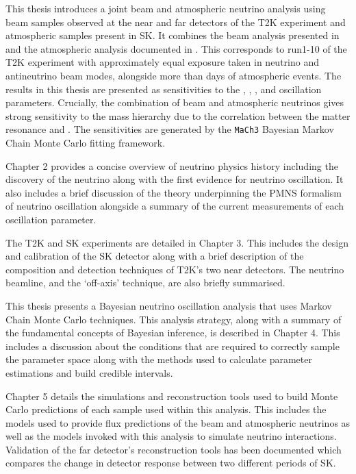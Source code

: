 This thesis introduces a joint beam and atmospheric neutrino analysis using beam samples observed at the near and far detectors of the T2K experiment and atmospheric samples present in SK. It combines the beam analysis presented in \cite{Dunne2020-uf} and the atmospheric analysis documented in \cite{Jiang2019-iw}. This corresponds to run1-10 of the T2K experiment with approximately equal exposure taken in neutrino and antineutrino beam modes, alongside more than  days of atmospheric events. The results in this thesis are presented as sensitivities to the , , , and  oscillation parameters. Crucially, the combination of beam and atmospheric neutrinos gives strong sensitivity to the mass hierarchy due to the correlation between the matter resonance and . The sensitivities are generated by the \texttt{MaCh3} Bayesian Markov Chain Monte Carlo fitting framework.

Chapter 2 provides a concise overview of neutrino physics history including the discovery of the neutrino along with the first evidence for neutrino oscillation. It also includes a brief discussion of the theory underpinning the PMNS formalism of neutrino oscillation alongside a summary of the current measurements of each oscillation parameter.

The T2K and SK experiments are detailed in Chapter 3. This includes the design and calibration of the SK detector along with a brief description of the composition and detection techniques of T2K's two near detectors. The neutrino beamline, and the `off-axis' technique, are also briefly summarised. 

This thesis presents a Bayesian neutrino oscillation analysis that uses Markov Chain Monte Carlo techniques. This analysis strategy, along with a summary of the fundamental concepts of Bayesian inference, is described in Chapter 4. This includes a discussion about the conditions that are required to correctly sample the parameter space along with the methods used to calculate parameter estimations and build credible intervals.

Chapter 5 details the simulations and reconstruction tools used to build Monte Carlo predictions of each sample used within this analysis. This includes the models used to provide flux predictions of the beam and atmospheric neutrinos as well as the models invoked with this analysis to simulate neutrino interactions. Validation of the far detector's reconstruction tools has been documented which compares the change in detector response between two different periods of SK.


